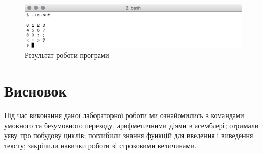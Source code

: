 \documentclass[a4paper,oneside,DIV=12,12pt,headings=normal]{scrartcl}
\begin{document}
		\begin{figure}[!htbp]
		\centering
			\includegraphics[width = \linewidth]{./assets/y02s02-sysprog-lab-03-programres.png}
		\caption{Результат роботи програми}
		\label{fig:program-result-screenshot}
		\end{figure}
		
	\section{Висновок}
		Під час виконання даної лабораторної роботи ми ознайомились з командами умовного та безумовного переходу, арифметичними діями в асемблері; отримали уяву про побудову циклів; поглибили знання функцій для введення і виведення тексту; закріпили навички роботи зі строковими величинами.
\end{document}

